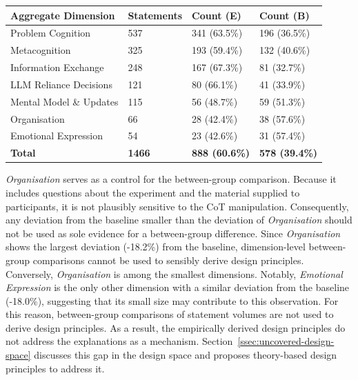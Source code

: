 \begin{ctable}
    \centering
    \begin{tabularx}{\textwidth}{X l l l}
        \toprule
        \textbf{Aggregate Dimension} & \textbf{Statements} & \textbf{Count (E)} & \textbf{Count (B)} \\
        \midrule
        Problem Cognition & 537 & 341 (63.5\%) & 196 (36.5\%)\\
        Metacognition & 325 & 193 (59.4\%) & 132 (40.6\%)\\
        Information Exchange & 248 & 167 (67.3\%) & 81 (32.7\%)\\
        LLM Reliance Decisions & 121 & 80 (66.1\%) & 41 (33.9\%)\\
        Mental Model \& Updates & 115 & 56 (48.7\%) & 59 (51.3\%)\\
        Organisation & 66 & 28 (42.4\%) & 38 (57.6\%)\\
        Emotional Expression & 54 & 23 (42.6\%) & 31 (57.4\%) \\
        \midrule
        \textbf{Total} & \textbf{1466} & \textbf{888 (60.6\%)} & \textbf{578 (39.4\%)} \\
        \bottomrule
    \end{tabularx}
    \caption[Statement counts per aggregate dimension]{Statement counts per aggregate dimension, with the number of statements from each group and the corresponding share in parentheses.}
    \label{tab:statement-counts}
\end{ctable}

\textit{Organisation} serves as a control for the between-group comparison. Because it includes questions about the experiment and the material supplied to participants, it is not plausibly sensitive to the \ac{CoT} manipulation. Consequently, any deviation from the baseline smaller than the deviation of \textit{Organisation} should not be used as sole evidence for a between-group difference. Since \textit{Organisation} shows the largest deviation (-18.2\%) from the baseline, dimension-level between-group comparisons cannot be used to sensibly derive design principles. Conversely, \textit{Organisation} is among the smallest dimensions. Notably, \textit{Emotional Expression} is the only other dimension with a similar deviation from the baseline (-18.0\%), suggesting that its small size may contribute to this observation. For this reason, between-group comparisons of statement volumes are not used to derive design principles. As a result, the empirically derived design principles do not address the explanations as a mechanism. Section~\ref{ssec:uncovered-design-space} discusses this gap in the design space and proposes theory-based design principles to address it.

